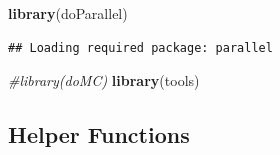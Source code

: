 \documentclass[]{article}
\newenvironment{Shaded}{\begin{snugshade}}{\end{snugshade}}
\newcommand{\KeywordTok}[1]{\textcolor[rgb]{0.13,0.29,0.53}{\textbf{#1}}}
\newcommand{\CommentTok}[1]{\textcolor[rgb]{0.56,0.35,0.01}{\textit{#1}}}
\newcommand{\NormalTok}[1]{#1}
\begin{document}
\begin{Shaded}
\begin{Highlighting}[]
\KeywordTok{library}\NormalTok{(doParallel)}
\end{Highlighting}
\end{Shaded}

\begin{verbatim}
## Loading required package: parallel
\end{verbatim}

\begin{Shaded}
\begin{Highlighting}[]
\CommentTok{#library(doMC)}
\KeywordTok{library}\NormalTok{(tools)}
\end{Highlighting}
\end{Shaded}

\subsection{Helper Functions}\label{helper-functions}
\end{document}
